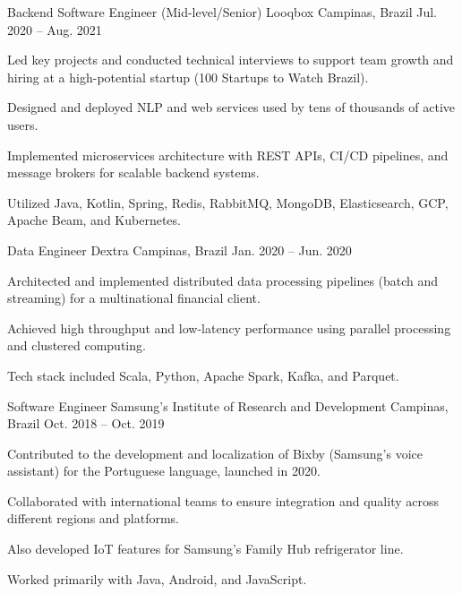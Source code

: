\begin{cventries}
  \cventry
    {Backend Software Engineer (Mid-level/Senior)}
    {Looqbox}
    {Campinas, Brazil}
    {Jul. 2020 -- Aug. 2021}
    {
      \begin{cvitems}
        \item {Led key projects and conducted technical interviews to support team growth and hiring at a high-potential startup (100 Startups to Watch Brazil).}
        \item {Designed and deployed NLP and web services used by tens of thousands of active users.}
        \item {Implemented microservices architecture with REST APIs, CI/CD pipelines, and message brokers for scalable backend systems.}
        \item {Utilized Java, Kotlin, Spring, Redis, RabbitMQ, MongoDB, Elasticsearch, GCP, Apache Beam, and Kubernetes.}
      \end{cvitems}
    }

  \cventry
    {Data Engineer}
    {Dextra}
    {Campinas, Brazil}
    {Jan. 2020 -- Jun. 2020}
    {
      \begin{cvitems}
        \item {Architected and implemented distributed data processing pipelines (batch and streaming) for a multinational financial client.}
        \item {Achieved high throughput and low-latency performance using parallel processing and clustered computing.}
        \item {Tech stack included Scala, Python, Apache Spark, Kafka, and Parquet.}
      \end{cvitems}
    }

  \cventry
    {Software Engineer}
    {Samsung's Institute of Research and Development}
    {Campinas, Brazil}
    {Oct. 2018 -- Oct. 2019}
    {
      \begin{cvitems}
        \item {Contributed to the development and localization of Bixby (Samsung’s voice assistant) for the Portuguese language, launched in 2020.}
        \item {Collaborated with international teams to ensure integration and quality across different regions and platforms.}
        \item {Also developed IoT features for Samsung’s Family Hub refrigerator line.}
        \item {Worked primarily with Java, Android, and JavaScript.}
      \end{cvitems}
    }

\end{cventries}

